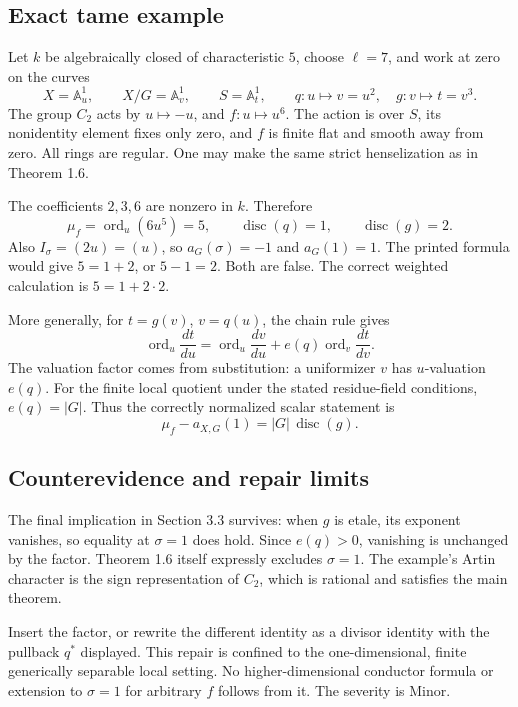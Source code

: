 \documentclass[10pt]{article}
\begin{document}
\subsection*{Exact tame example}
Let \(k\) be algebraically closed of characteristic \(5\), choose \(\ell=7\), and work at zero on the curves \[X=\mathbb A^1_u,\qquad X/G=\mathbb A^1_v,\qquad
 S=\mathbb A^1_t,\qquad
 q:u\mapsto v=u^2,\quad g:v\mapsto t=v^3.\] The group \(C_2\) acts by \(u\mapsto-u\), and \(f:u\mapsto u^6\). The action is over \(S\), its nonidentity element fixes only zero, and \(f\) is finite flat and smooth away from zero. All rings are regular. One may make the same strict henselization as in Theorem 1.6.\par
The coefficients \(2,3,6\) are nonzero in \(k\). Therefore \[\mu_f=\operatorname{ord}_u(6u^5)=5,\qquad
 \operatorname{disc}(q)=1,\qquad \operatorname{disc}(g)=2.\] Also \(I_\sigma=(2u)=(u)\), so \(a_G(\sigma)=-1\) and \(a_G(1)=1\). The printed formula would give \(5=1+2\), or \(5-1=2\). Both are false. The correct weighted calculation is \(5=1+2\cdot2\).\par
More generally, for \(t=g(v)\), \(v=q(u)\), the chain rule gives \[\operatorname{ord}_u\frac{dt}{du}
 =\operatorname{ord}_u\frac{dv}{du}
   + e(q)\operatorname{ord}_v\frac{dt}{dv}.\] The valuation factor comes from substitution: a uniformizer \(v\) has \(u\)-valuation \(e(q)\). For the finite local quotient under the stated residue-field conditions, \(e(q)=|G|\). Thus the correctly normalized scalar statement is \[\mu_f-a_{X,G}(1)=|G|\,\operatorname{disc}(g).\]\par
\subsection*{Counterevidence and repair limits}
The final implication in Section 3.3 survives: when \(g\) is etale, its exponent vanishes, so equality at \(\sigma=1\) does hold. Since \(e(q)>0\), vanishing is unchanged by the factor. Theorem 1.6 itself expressly excludes \(\sigma=1\). The example’s Artin character is the sign representation of \(C_2\), which is rational and satisfies the main theorem.\par
Insert the factor, or rewrite the different identity as a divisor identity with the pullback \(q^*\) displayed. This repair is confined to the one-dimensional, finite generically separable local setting. No higher-dimensional conductor formula or extension to \(\sigma=1\) for arbitrary \(f\) follows from it. The severity is Minor.\par
\end{document}
